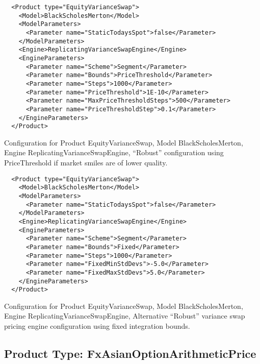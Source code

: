 \begin{listing}[ht]
\begin{verbatim}
  <Product type="EquityVarianceSwap">
    <Model>BlackScholesMerton</Model>
    <ModelParameters>
      <Parameter name="StaticTodaysSpot">false</Parameter>
    </ModelParameters>
    <Engine>ReplicatingVarianceSwapEngine</Engine>
    <EngineParameters>
      <Parameter name="Scheme">Segment</Parameter>
      <Parameter name="Bounds">PriceThreshold</Parameter>
      <Parameter name="Steps">1000</Parameter>
      <Parameter name="PriceThreshold">1E-10</Parameter>
      <Parameter name="MaxPriceThresholdSteps">500</Parameter>
      <Parameter name="PriceThresholdStep">0.1</Parameter>
    </EngineParameters>
  </Product>
\end{verbatim}
\caption{Configuration for Product EquityVarianceSwap, Model BlackScholesMerton, Engine ReplicatingVarianceSwapEngine,
  ``Robust'' configuration using PriceThreshold if market smiles are of lower quality.}
\label{lst:peconfig_EquityVarianceSwap_BlackScholesMerton_ReplicatingVarianceSwapEngine_1}
\end{listing}

\begin{listing}[ht]
\begin{verbatim}
  <Product type="EquityVarianceSwap">
    <Model>BlackScholesMerton</Model>
    <ModelParameters>
      <Parameter name="StaticTodaysSpot">false</Parameter>
    </ModelParameters>
    <Engine>ReplicatingVarianceSwapEngine</Engine>
    <EngineParameters>
      <Parameter name="Scheme">Segment</Parameter>
      <Parameter name="Bounds">Fixed</Parameter>
      <Parameter name="Steps">1000</Parameter>
      <Parameter name="FixedMinStdDevs">-5.0</Parameter>
      <Parameter name="FixedMaxStdDevs">5.0</Parameter>
    </EngineParameters>
  </Product>
\end{verbatim}
\caption{Configuration for Product EquityVarianceSwap, Model BlackScholesMerton, Engine ReplicatingVarianceSwapEngine,
  Alternative ``Robust'' variance swap pricing engine configuration using fixed integration bounds.}
\label{lst:peconfig_EquityVarianceSwap_BlackScholesMerton_ReplicatingVarianceSwapEngine_2}
\end{listing}

\subsection{Product Type: FxAsianOptionArithmeticPrice}

